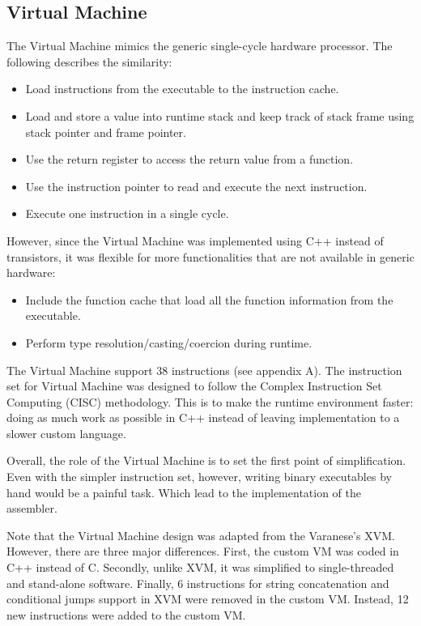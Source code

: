 \documentclass[manuscript,screen,nonacm]{acmart}
\begin{document}
\subsection{Virtual Machine}
The Virtual Machine mimics the generic single-cycle hardware processor. The following describes the similarity:
\begin{itemize}
    \item Load instructions from the executable to the instruction cache. 
    \item Load and store a value into runtime stack and keep track of stack frame using stack pointer and frame pointer.
    \item Use the return register to access the return value from a function.
    \item Use the instruction pointer to read and execute the next instruction.
    \item Execute one instruction in a single cycle.
\end{itemize}
However, since the Virtual Machine was implemented using C++ instead of transistors, it was flexible for more functionalities that are not available in generic hardware:
\begin{itemize}
    \item Include the function cache that load all the function information from the executable.
    \item Perform type resolution/casting/coercion during runtime.
\end{itemize}
The Virtual Machine support 38 instructions (see appendix A). The instruction set for Virtual Machine was designed to follow the Complex Instruction Set Computing (CISC) methodology. This is to make the runtime environment faster: doing as much work as possible in C++ instead of leaving implementation to a slower custom language.

Overall, the role of the Virtual Machine is to set the first point of simplification. Even with the simpler instruction set, however, writing binary executables by hand would be a painful task. Which lead to the implementation of the assembler.

Note that the Virtual Machine design was adapted from the Varanese's XVM\cite{Varanese}. However, there are three major differences. First, the custom VM was coded in C++ instead of C. Secondly, unlike XVM, it was simplified to single-threaded and stand-alone software. Finally, 6 instructions for string concatenation and conditional jumps support in XVM were removed in the custom VM. Instead, 12 new instructions were added to the custom VM. 
\end{document}
